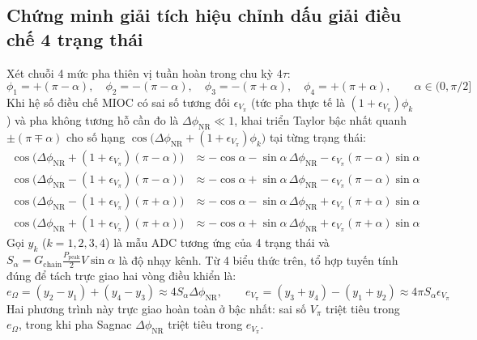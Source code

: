 \documentclass[11pt, a4paper]{article}
\begin{document}
\subsection*{Chứng minh giải tích hiệu chỉnh dấu giải điều chế 4 trạng thái}
Xét chuỗi 4 mức pha thiên vị tuần hoàn trong chu kỳ $4\tau$:
\begin{equation}
\phi_1 = +(\pi - \alpha), \quad
\phi_2 = -(\pi - \alpha), \quad
\phi_3 = -(\pi + \alpha), \quad
\phi_4 = +(\pi + \alpha), \qquad \alpha \in (0, \pi/2]
\end{equation}
Khi hệ số điều chế MIOC có sai số tương đối $\epsilon_{V_\pi}$ (tức pha thực tế là $(1+\epsilon_{V_\pi})\phi_k$) và pha không tương hỗ cần đo là $\Delta\phi_{\text{NR}} \ll 1$, khai triển Taylor bậc nhất quanh $\pm(\pi \mp \alpha)$ cho số hạng $\cos\bigl(\Delta\phi_{\text{NR}} + (1+\epsilon_{V_\pi})\phi_k\bigr)$ tại từng trạng thái:
\begin{align}
\cos\bigl(\Delta\phi_{\text{NR}} + (1+\epsilon_{V_\pi})(\pi-\alpha)\bigr) &\approx -\cos\alpha - \sin\alpha\,\Delta\phi_{\text{NR}} - \epsilon_{V_\pi}(\pi-\alpha)\sin\alpha \\
\cos\bigl(\Delta\phi_{\text{NR}} - (1+\epsilon_{V_\pi})(\pi-\alpha)\bigr) &\approx -\cos\alpha + \sin\alpha\,\Delta\phi_{\text{NR}} - \epsilon_{V_\pi}(\pi-\alpha)\sin\alpha \\
\cos\bigl(\Delta\phi_{\text{NR}} - (1+\epsilon_{V_\pi})(\pi+\alpha)\bigr) &\approx -\cos\alpha - \sin\alpha\,\Delta\phi_{\text{NR}} + \epsilon_{V_\pi}(\pi+\alpha)\sin\alpha \\
\cos\bigl(\Delta\phi_{\text{NR}} + (1+\epsilon_{V_\pi})(\pi+\alpha)\bigr) &\approx -\cos\alpha + \sin\alpha\,\Delta\phi_{\text{NR}} + \epsilon_{V_\pi}(\pi+\alpha)\sin\alpha
\end{align}
Gọi $y_k$ ($k=1,2,3,4$) là mẫu ADC tương ứng của 4 trạng thái và $S_\alpha = G_{\text{chain}} \frac{P_{\text{peak}}}{2} V \sin\alpha$ là độ nhạy kênh. Từ 4 biểu thức trên, tổ hợp tuyến tính đúng để tách trực giao hai vòng điều khiển là:
\begin{equation}
e_\Omega = (y_2 - y_1) + (y_4 - y_3) \approx 4 S_\alpha \Delta\phi_{\text{NR}}, \qquad
e_{V_\pi} = (y_3 + y_4) - (y_1 + y_2) \approx 4\pi S_\alpha \epsilon_{V_\pi}
\end{equation}
Hai phương trình này trực giao hoàn toàn ở bậc nhất: sai số $V_\pi$ triệt tiêu trong $e_\Omega$, trong khi pha Sagnac $\Delta\phi_{\text{NR}}$ triệt tiêu trong $e_{V_\pi}$.

\end{document}

